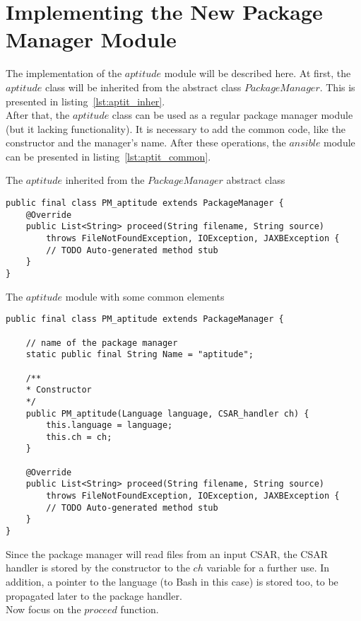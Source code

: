 \section{Implementing the New Package Manager Module}\label{sec:aptitude_imp}
The implementation of the $aptitude$ module will be described here.
At first, the $aptitude$ class will be inherited from the abstract class $PackageManager$. 
This is presented in listing~\ref{lst:aptit_inher}.\\
After that, the $aptitude$ class can be used as a regular package manager module (but it lacking functionality).
It is necessary to add the common code, like the constructor and the manager's name.
After these operations, the $ansible$ module can be presented in listing~\ref{lst:aptit_common}.\\
\begin{Listing} 
	\caption{The $aptitude$ inherited from the $PackageManager$ abstract class}
	\label{lst:aptit_inher}
\begin{lstlisting}
public final class PM_aptitude extends PackageManager {
	@Override
	public List<String> proceed(String filename, String source)
		throws FileNotFoundException, IOException, JAXBException {
		// TODO Auto-generated method stub
	}
}
\end{lstlisting}
\end{Listing} 
\begin{Listing} 
\caption{The $aptitude$ module with some common elements}
\label{lst:aptit_common}
\begin{lstlisting}
public final class PM_aptitude extends PackageManager {

	// name of the package manager
	static public final String Name = "aptitude";
	
	/**
	* Constructor
	*/
	public PM_aptitude(Language language, CSAR_handler ch) {
		this.language = language;
		this.ch = ch;
	}
	
	@Override
	public List<String> proceed(String filename, String source)
		throws FileNotFoundException, IOException, JAXBException {
		// TODO Auto-generated method stub
	}
}
\end{lstlisting}
\end{Listing} 
Since the package manager will read files from an input CSAR, the CSAR handler is stored by the constructor to the $ch$ variable for a further use.
In addition, a pointer to the language (to Bash in this case) is stored too, to be propagated later to the package handler.\\
Now focus on the $proceed$ function.

